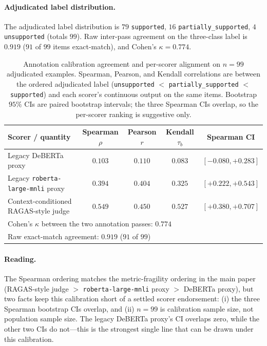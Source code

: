 \paragraph{Adjudicated label distribution.}
The adjudicated label distribution is $79$ \texttt{supported},
$16$ \texttt{partially\_supported}, $4$ \texttt{unsupported} (totals
$99$). Raw inter-pass agreement on the three-class label is
$0.919$ ($91$ of $99$ items exact-match), and Cohen's
$\kappa = 0.774$.

\begin{table}[!htb]
\centering
\caption{Annotation calibration agreement and per-scorer alignment
on $n=99$ adjudicated examples.
Spearman, Pearson, and Kendall correlations are between the
ordered adjudicated label
(\texttt{unsupported} $<$ \texttt{partially\_supported} $<$
\texttt{supported}) and each scorer's continuous output on the same
items. Bootstrap $95\%$ CIs are paired bootstrap intervals; the three
Spearman CIs overlap, so the per-scorer ranking is suggestive only.}
\label{tab:supp:human_calibration}
\footnotesize
\begin{tabular}{lcccc}
\toprule
Scorer / quantity & Spearman $\rho$ & Pearson $r$ & Kendall $\tau_b$ & Spearman CI \\
\midrule
Legacy DeBERTa proxy             & $0.103$ & $0.110$ & $0.083$ & $[-0.080, +0.283]$ \\
Legacy \texttt{roberta-large-mnli} proxy & $0.394$ & $0.404$ & $0.325$ & $[+0.222, +0.543]$ \\
Context-conditioned RAGAS-style judge & $0.549$ & $0.450$ & $0.527$ & $[+0.380, +0.707]$ \\
\midrule
\multicolumn{5}{l}{Cohen's $\kappa$ between the two annotation passes: $0.774$} \\
\multicolumn{5}{l}{Raw exact-match agreement: $0.919$ ($91$ of $99$)} \\
\bottomrule
\end{tabular}
\end{table}

\paragraph{Reading.} The Spearman ordering matches the
metric-fragility ordering in the main paper (RAGAS-style judge $>$
\texttt{roberta-large-mnli} proxy $>$ DeBERTa proxy), but two facts
keep this calibration short of a settled scorer endorsement: (i) the
three Spearman bootstrap CIs overlap, and (ii) $n=99$ is calibration
sample size, not population sample size. The legacy DeBERTa proxy's
CI overlaps zero, while the other two CIs do not---this is the
strongest single line that can be drawn under this calibration.


